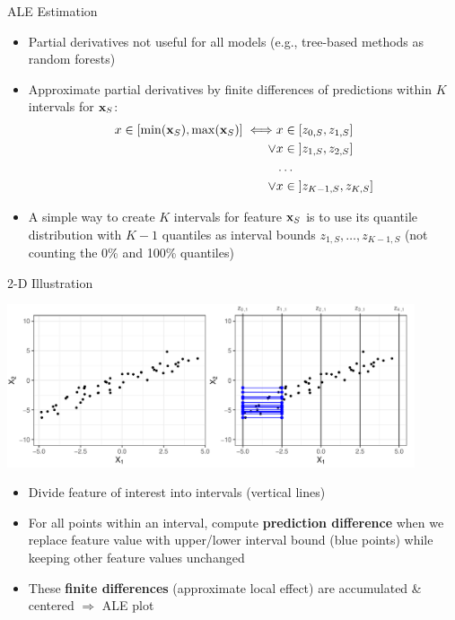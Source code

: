 \documentclass[11pt,compress,t,notes=noshow, aspectratio=169, xcolor=table]{beamer}
\begin{document}

\begin{frame}{ALE Estimation}

\begin{itemize}
  \item Partial derivatives not useful for all models (e.g., tree-based methods as random forests)
  \item Approximate partial derivatives by finite differences of predictions within $K$ intervals for $\xv_S$:
  $$
  \begin{aligned}
  x \in [\min(\xv_S), \max(\xv_S)] \iff &x \in [z_{0, S}, z_{1, S}] \\
  \lor &x \in \; ]z_{1, S}, z_{2, S}] \\
  &\dots \\
  \lor &x \in \; ]z_{K-1, S}, z_{K, S}]
  \end{aligned}
  $$
  \item A simple way to create $K$ intervals for feature $\xv_S$ is to use its quantile distribution with $K-1$ quantiles as interval bounds $z_{1,S}, \dots, z_{K-1,S}$ (not counting the 0\% and 100\% quantiles)
\end{itemize}

\end{frame}


\begin{frame}{2-D Illustration}

\centerline{\includegraphics[width=0.9\textwidth]{figure/ale_interval}}

\begin{itemize}
\item Divide feature of interest into intervals (vertical lines)
\item For all points within an interval, compute \textbf{prediction difference} when we replace feature value with upper/lower interval bound (blue points) while keeping other feature values unchanged
\item These \textbf{finite differences} (approximate local effect) are accumulated \& centered $\Rightarrow$ ALE plot %
\end{itemize}

\end{frame}
\end{document}
